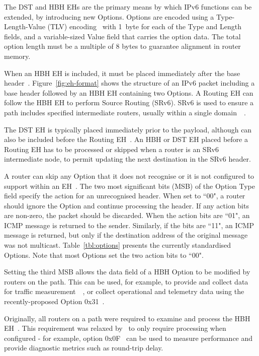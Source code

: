 \documentclass[conference]{IEEEtran}
\begin{document}
The DST and HBH EHs are the primary means by which IPv6 functions
can be extended, by introducing new Options. 
Options are encoded using a Type-Length-Value (TLV)
encoding~\cite{rfc8200} with 1~byte for each of the Type and Length fields, and
a variable-sized Value field that carries the option data. The total option
length must be a multiple of 8 bytes to guarantee alignment in router memory.

When an HBH EH is included, it must be placed immediately after the base
header~\cite{rfc8200}.  Figure~\ref{fig:eh-format} shows the structure of an
IPv6 packet including a base header followed by an HBH EH containing two
Options.  A Routing EH can follow the HBH EH to perform Source
Routing (SRv6). SRv6 is used to ensure a path includes specified intermediate
routers, usually within a single domain~\cite{srv6}~\cite{srperf}. 

The DST EH
is typically placed immediately prior to the payload, although can also be included before the Routing EH~\cite{rfc8200}. An HBH or
DST EH placed before a Routing EH has to be processed or skipped when a router is an
SRv6 intermediate node, to permit updating the next destination in the SRv6 header. 


A router can skip any Option that it does not recognise or it is not configured to
support within an EH~\cite{rfc8200}.  The two most significant bits (MSB) of the Option Type field specify
the action for an unrecognised header.  When set to ``00", a router should
ignore the Option and continue processing the header.  If any action bits are
non-zero, the packet should be discarded.  When the action bits are ``01", an
ICMP message is returned to the sender. Similarly, if the bits are ``11",
an ICMP message is returned, but only if the destination address of the original message was not multicast.
Table~\ref{tbl:options} presents the currently standardised Options.  Note that
most Options set the two action bits to ``00".

Setting the third MSB allows the data field of a HBH Option to be modified by
routers on the path. This can be used, for
example, to provide and collect data for traffic measurement~\cite{rfc9268}~\cite{rfc9343}, or collect operational and telemetry
data using the recently-proposed Option 0x31~\cite{ietf-ippm-ioam-ipv6-options-12}.  

Originally, all routers on a
path were required to examine and process the HBH EH~\cite{rfc2460}. This
requirement was relaxed by~\cite{rfc8200} to only require processing when
configured - for example, option 0x0F~\cite{rfc8250} can be used to measure
performance and provide diagnostic metrics such as round-trip delay. 
\end{document}

